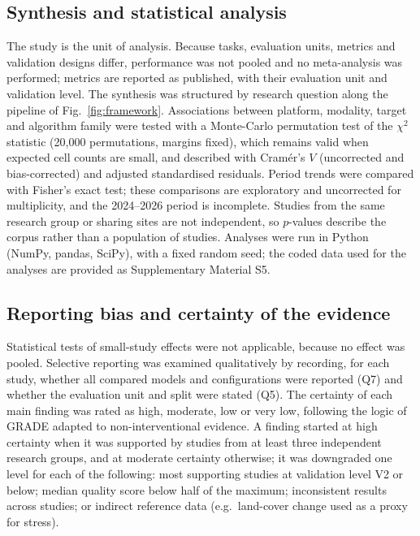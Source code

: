 \documentclass[preprint,12pt]{elsarticle}
\begin{document}
\subsection{Synthesis and statistical analysis}
The study is the unit of analysis. Because tasks, evaluation units, metrics and validation designs differ, performance was not pooled and no meta-analysis was performed; metrics are reported as published, with their evaluation unit and validation level. The synthesis was structured by research question along the pipeline of Fig.~\ref{fig:framework}. Associations between platform, modality, target and algorithm family were tested with a Monte-Carlo permutation test of the $\chi^2$ statistic (20{,}000 permutations, margins fixed), which remains valid when expected cell counts are small, and described with Cram\'er's $V$ (uncorrected and bias-corrected) and adjusted standardised residuals. Period trends were compared with Fisher's exact test; these comparisons are exploratory and uncorrected for multiplicity, and the 2024--2026 period is incomplete. Studies from the same research group or sharing sites are not independent, so $p$-values describe the corpus rather than a population of studies. Analyses were run in Python (NumPy, pandas, SciPy), with a fixed random seed; the coded data used for the analyses are provided as Supplementary Material S5.
 
\subsection{Reporting bias and certainty of the evidence}
Statistical tests of small-study effects were not applicable, because no effect was pooled. Selective reporting was examined qualitatively by recording, for each study, whether all compared models and configurations were reported (Q7) and whether the evaluation unit and split were stated (Q5). The certainty of each main finding was rated as high, moderate, low or very low, following the logic of GRADE \citep{guyatt2008grade} adapted to non-interventional evidence. A finding started at high certainty when it was supported by studies from at least three independent research groups, and at moderate certainty otherwise; it was downgraded one level for each of the following: most supporting studies at validation level V2 or below; median quality score below half of the maximum; inconsistent results across studies; or indirect reference data (e.g.\ land-cover change used as a proxy for stress).
 
\end{document}
